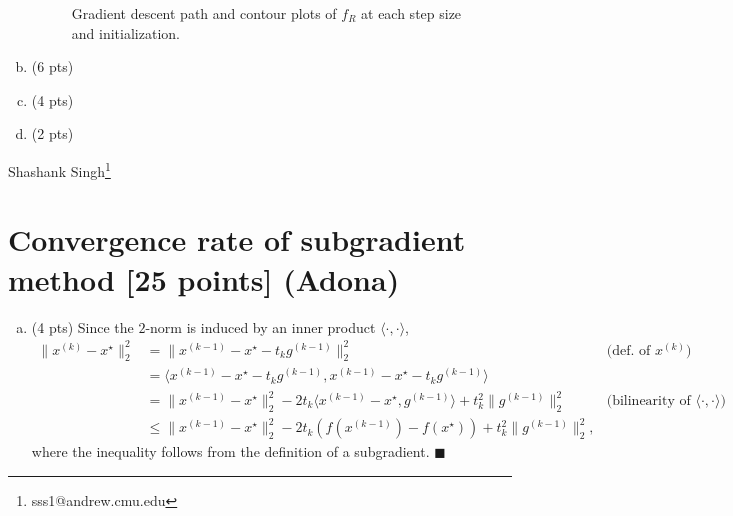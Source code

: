 \documentclass[11pt]{article}
\newcommand{\qed}{\quad \ensuremath{\blacksquare}}      %
\begin{document}
\begin{enumerate}[(a)]
\begin{figure}[h!]
\begin{center}
\end{center}
\caption{Gradient descent path and contour plots of $f_R$ at each step size and
initialization.}
\label{fig:grad4}
\end{figure}
\item (6 pts)
\item (4 pts)
\item (2 pts)
\end{enumerate}

\newpage
\null
\newpage
\null
\newpage
Shashank Singh\footnote{sss1@andrew.cmu.edu}
\section{Convergence rate of subgradient method [25 points] (Adona)}
\begin{enumerate}[(a)]
\item (4 pts) Since the $2$-norm is induced by an inner product
$\langle\cdot,\cdot\rangle$,
\begin{align*}
\|x^{(k)} - x^\star\|_2^2
 & = \|x^{(k - 1)} - x^\star - t_kg^{(k - 1)}\|_2^2
                                    & \mbox{(def. of $x^{(k)}$)} \\
 & = \langle x^{(k - 1)} - x^\star - t_kg^{(k - 1)},
             x^{(k - 1)} - x^\star - t_kg^{(k - 1)} \rangle \\
 & = \|x^{(k - 1)} - x^\star\|_2^2
   - 2t_k \langle x^{(k - 1)} - x^\star,g^{(k - 1)}\rangle
   + t_k^2\|g^{(k - 1)}\|_2^2
                    & \mbox{(bilinearity of $\langle\cdot,\cdot\rangle$)} \\
 & \leq \|x^{(k - 1)} - x^\star\|_2^2
   - 2t_k \left(f(x^{(k - 1)}) - f(x^\star)\right)
   + t_k^2\|g^{(k - 1)}\|_2^2,
\end{align*}
where the inequality follows from the definition of a subgradient. \qed


\end{enumerate}
\end{document}
